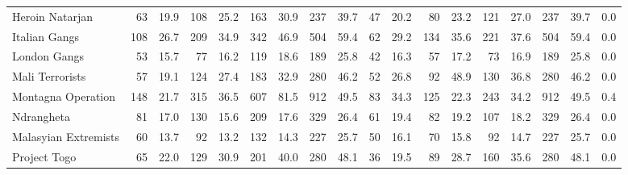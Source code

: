 \begin{tabular}{lrrrrrrrrrrrrrrrrl}
Heroin Natarjan      &                63 &  19.9 &  108 &  25.2 &  163 &  30.9 &  237 &  39.7 &               47 &   20.2 &   80 &   23.2 &  121 &   27.0 &  237 &  39.7 &        0.0 \\
Italian Gangs        &               108 &  26.7 &  209 &  34.9 &  342 &  46.9 &  504 &  59.4 &               62 &   29.2 &  134 &   35.6 &  221 &   37.6 &  504 &  59.4 &        0.0 \\
London Gangs         &                53 &  15.7 &   77 &  16.2 &  119 &  18.6 &  189 &  25.8 &               42 &   16.3 &   57 &   17.2 &   73 &   16.9 &  189 &  25.8 &        0.0 \\
Mali Terrorists      &                57 &  19.1 &  124 &  27.4 &  183 &  32.9 &  280 &  46.2 &               52 &   26.8 &   92 &   48.9 &  130 &   36.8 &  280 &  46.2 &        0.0 \\
Montagna Operation   &               148 &  21.7 &  315 &  36.5 &  607 &  81.5 &  912 &  49.5 &               83 &   34.3 &  125 &   22.3 &  243 &   34.2 &  912 &  49.5 &        0.4 \\
Ndrangheta           &                81 &  17.0 &  130 &  15.6 &  209 &  17.6 &  329 &  26.4 &               61 &   19.4 &   82 &   19.2 &  107 &   18.2 &  329 &  26.4 &        0.0 \\
Malasyian Extremists &                60 &  13.7 &   92 &  13.2 &  132 &  14.3 &  227 &  25.7 &               50 &   16.1 &   70 &   15.8 &   92 &   14.7 &  227 &  25.7 &        0.0 \\
Project Togo         &                65 &  22.0 &  129 &  30.9 &  201 &  40.0 &  280 &  48.1 &               36 &   19.5 &   89 &   28.7 &  160 &   35.6 &  280 &  48.1 &        0.0 \\
\bottomrule
\end{tabular}

